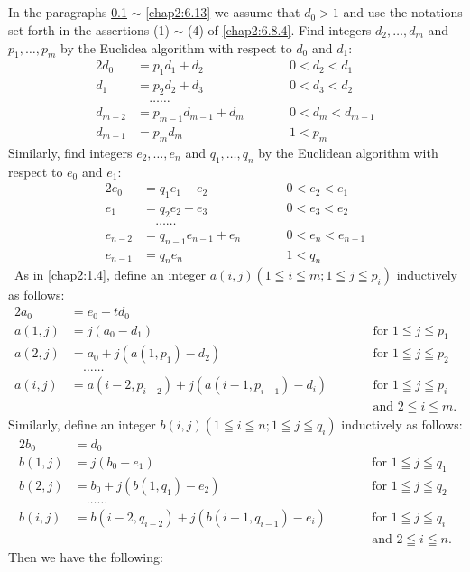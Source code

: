 \subsection{}\label{chap2:6.9}
In the paragraphs \ref{chap2:6.9} $\sim$ \ref{chap2:6.13} we assume that $d_{0}>1$
and use the notations set forth in the assertions (1) $\sim$ (4) of
\ref{chap2:6.8.4}. Find integers $d_{2},\ldots,d_{m}$ and
$p_{1},\ldots,p_{m}$ by the Euclidea algorithm with respect to $d_{0}$
and $d_{1}$: 
\begin{alignat*}{2}
d_{0} &= p_{1}d_{1}+d_{2}\qquad && 0<d_{2}<d_{1}\\
d_{1} &= p_{2}d_{2}+d_{3}\qquad && 0<d_{3}<d_{2}\\
&\quad\ldots\ldots &\\
d_{m-2} &= p_{m-1}d_{m-1}+d_{m} \qquad && 0<d_{m}<d_{m-1}\\
d_{m-1} &= p_{m}d_{m} \qquad && 1<p_{m}
\end{alignat*}
Similarly, find integers $e_{2},\ldots,e_{n}$ and $q_{1},\ldots,q_{n}$
by the Euclidean algorithm with respect to $e_{0}$ and $e_{1}:$
\begin{alignat*}{2}
e_{0} &= q_{1}e_{1}+e_{2}\qquad && 0<e_{2}<e_{1}\\
e_{1} &= q_{2}e_{2}+e_{3} \qquad && 0<e_{3}<e_{2}\\
 &\quad\ldots\ldots &&\\
e_{n-2} &= q_{n-1}e_{n-1}+e_{n}\qquad && 0<e_{n}<e_{n-1}\\
e_{n-1} &= q_{n}e_{n} \qquad && 1<q_{n}
\end{alignat*}\pageoriginale\ 
As in \ref{chap2:1.4}, define an integer $a(i,j)(1\leqq i\leqq m;1\leqq
j\leqq p_{i})$ inductively as follows:
\begin{alignat*}{2}
a_{0} &= e_{0}-td_{0} &&\\
a(1,j) &= j(a_{0}-d_{1})  && \text{for } 1\leqq j\leqq p_{1}\\
a(2,j) &= a_{0}+j(a(1,p_{1})-d_{2}) &&\text{for } 1\leqq j\leqq
p_{2}\\
&\quad\ldots\ldots &&\\
a(i,j) &= a(i-2,p_{i-2})+j(a(i-1,p_{i-1})-d_{i})\qquad &&\text{for } 1\leqq
j\leqq p_{i}\\
 & &&\text{and } 2\leqq i\leqq m.
\end{alignat*}
Similarly, define an integer $b(i,j)(1\leqq i\leqq n;1\leqq j\leqq
q_{i})$ inductively as follows:
\begin{alignat*}{2}
b_{0}  &= d_{0}  && \\
b(1,j) &= j(b_{0}-e_{1}) && \text{for } 1\leqq j\leqq q_{1}\\
b(2,j) &= b_{0}+j(b(1,q_{1})-e_{2}) && \text{for } 1\leqq j\leqq
q_{2}\\
 &\quad \ldots\ldots && \\
b(i,j) &= b(i-2,q_{i-2})+j(b(i-1,q_{i-1})-e_{i})\qquad &&\text{for }
1\leqq j\leqq q_{i}\\
 & && \text{and } 2\leqq i\leqq n. 
\end{alignat*}
Then we have the following:

